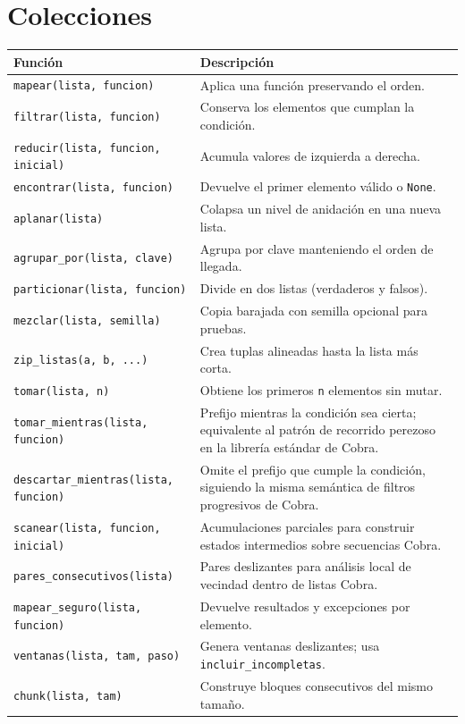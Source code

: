 \documentclass{article}
\begin{document}
\section*{Colecciones}
\begin{tabular}{ll}
\textbf{Función} & \textbf{Descripción}\\\hline
\texttt{mapear(lista, funcion)} & Aplica una función preservando el orden.\\
\texttt{filtrar(lista, funcion)} & Conserva los elementos que cumplan la condición.\\
\texttt{reducir(lista, funcion, inicial)} & Acumula valores de izquierda a derecha.\\
\texttt{encontrar(lista, funcion)} & Devuelve el primer elemento válido o \texttt{None}.\\
\texttt{aplanar(lista)} & Colapsa un nivel de anidación en una nueva lista.\\
\texttt{agrupar\_por(lista, clave)} & Agrupa por clave manteniendo el orden de llegada.\\
\texttt{particionar(lista, funcion)} & Divide en dos listas (verdaderos y falsos).\\
\texttt{mezclar(lista, semilla)} & Copia barajada con semilla opcional para pruebas.\\
\texttt{zip\_listas(a, b, ...)} & Crea tuplas alineadas hasta la lista más corta.\\
\texttt{tomar(lista, n)} & Obtiene los primeros \texttt{n} elementos sin mutar.\\
\texttt{tomar\_mientras(lista, funcion)} & Prefijo mientras la condición sea cierta; equivalente al patrón de recorrido perezoso en la librería estándar de Cobra.\\
\texttt{descartar\_mientras(lista, funcion)} & Omite el prefijo que cumple la condición, siguiendo la misma semántica de filtros progresivos de Cobra.\\
\texttt{scanear(lista, funcion, inicial)} & Acumulaciones parciales para construir estados intermedios sobre secuencias Cobra.\\
\texttt{pares\_consecutivos(lista)} & Pares deslizantes para análisis local de vecindad dentro de listas Cobra.\\
\texttt{mapear\_seguro(lista, funcion)} & Devuelve resultados y excepciones por elemento.\\
\texttt{ventanas(lista, tam, paso)} & Genera ventanas deslizantes; usa \texttt{incluir\_incompletas}.\\
\texttt{chunk(lista, tam)} & Construye bloques consecutivos del mismo tamaño.\\
\end{tabular}
\end{document}
